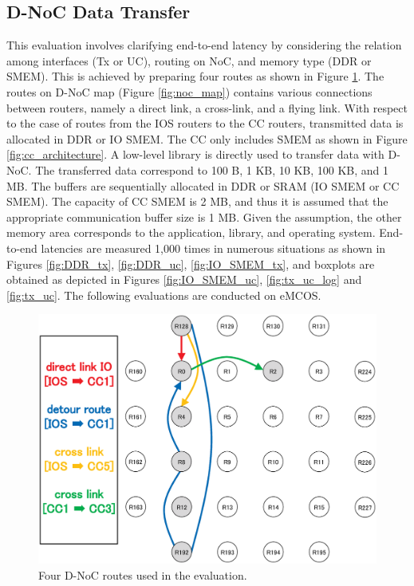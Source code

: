 \documentclass[conference,compsoc]{IEEEtran}
\begin{document}
\subsection{D-NoC Data Transfer}
\label{sec:dnoc_eval}
This evaluation involves clarifying end-to-end latency by considering the relation among interfaces (Tx or UC), routing on NoC, and memory type (DDR or SMEM).
This is achieved by preparing four routes as shown in Figure \ref{fig:noc_routes}.
The routes on D-NoC map (Figure \ref{fig:noc_map}) contains various connections between routers, namely a direct link, a cross-link, and a flying link.
With respect to the case of routes from the IOS routers to the CC routers, transmitted data is allocated in DDR or IO SMEM.
The CC only includes SMEM as shown in Figure \ref{fig:cc_architecture}.
A low-level library is directly used to transfer data with D-NoC.
The transferred data correspond to 100 B, 1 KB, 10 KB, 100 KB, and 1 MB.
The buffers are sequentially allocated in DDR or SRAM (IO SMEM or CC SMEM).
The capacity of CC SMEM is 2 MB, and thus it is assumed that the appropriate communication buffer size is 1 MB.
Given the assumption, the other memory area corresponds to the application, library, and operating system.
End-to-end latencies are measured 1,000 times in numerous situations as shown in Figures \ref{fig:DDR_tx}, \ref{fig:DDR_uc}, \ref{fig:IO_SMEM_tx}, and boxplots are obtained as depicted in Figures \ref{fig:IO_SMEM_uc}, \ref{fig:tx_uc_log} and \ref{fig:tx_uc}.
The following evaluations are conducted on eMCOS.

\begin{figure}[t]
  \centering
  \includegraphics[width=0.8\linewidth]{../figure/noc_routes.eps}
  \caption{\label{fig:noc_routes}
    Four D-NoC routes used in the evaluation.}
\end{figure}
\end{document}
